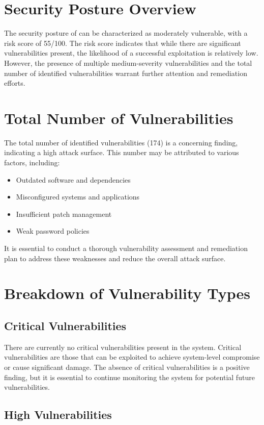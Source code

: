 \section{Security Posture Overview}

The security posture of  can be characterized as moderately vulnerable, with a risk score of 55/100. The risk score indicates that while there are significant vulnerabilities present, the likelihood of a successful exploitation is relatively low. However, the presence of multiple medium-severity vulnerabilities and the total number of identified vulnerabilities warrant further attention and remediation efforts.

\section{Total Number of Vulnerabilities}

The total number of identified vulnerabilities (174) is a concerning finding, indicating a high attack surface. This number may be attributed to various factors, including:
\begin{itemize}
\item Outdated software and dependencies
\item Misconfigured systems and applications
\item Insufficient patch management
\item Weak password policies
\end{itemize}
It is essential to conduct a thorough vulnerability assessment and remediation plan to address these weaknesses and reduce the overall attack surface.

\section{Breakdown of Vulnerability Types}

\subsection{Critical Vulnerabilities}

There are currently no critical vulnerabilities present in the system. Critical vulnerabilities are those that can be exploited to achieve system-level compromise or cause significant damage. The absence of critical vulnerabilities is a positive finding, but it is essential to continue monitoring the system for potential future vulnerabilities.

\subsection{High Vulnerabilities}

